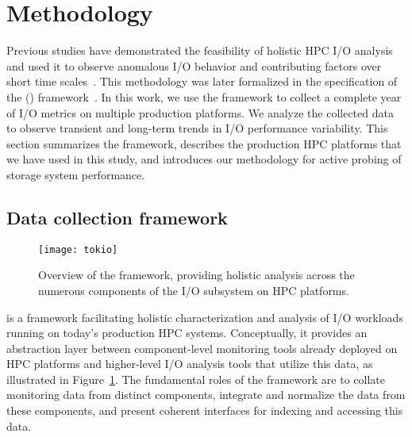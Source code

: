 \section{Methodology}\label{sec:methods}

Previous studies have demonstrated the feasibility of 
holistic HPC I/O analysis and used it to observe anomalous I/O behavior and
contributing factors over short time scales~\cite{Lockwood2017}. This methodology was later formalized in the specification of the \tokio (\tokiolong) framework~\cite{Lockwood2018tokio}. 
In this work, we use 
the \tokio framework
to collect 
a complete
year of I/O metrics on multiple production platforms. We analyze the collected data to observe transient and long-term trends in I/O performance variability.  This section
summarizes the \tokio framework, 
describes the production HPC platforms that we have 
used in this study,
and introduces our methodology for active probing of storage system
performance.

\subsection{Data collection framework}\label{sec:methods/tokio}

\begin{figure}
    \centering
    \texttt{[image: tokio]}
        \vspace{-.1in}
    \caption{Overview of the \tokio framework, providing holistic analysis across the numerous components of the I/O subsystem on HPC platforms.}
    \label{fig:tokio-framework}
    \vspace{-0.2in}
\end{figure}

\tokio is a framework facilitating holistic characterization and analysis of I/O workloads running on today's production HPC systems. Conceptually, it provides an abstraction layer between component-level monitoring tools already deployed on HPC platforms and higher-level I/O analysis tools that utilize this data, as illustrated in  Figure~\ref{fig:tokio-framework}. The fundamental roles of the \tokio framework are to collate monitoring data from distinct components, integrate and normalize the data from these components, and present coherent interfaces for indexing and accessing this data.

